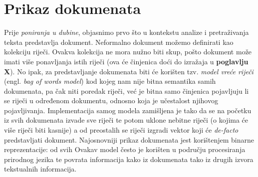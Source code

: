 \documentclass[times, utf8, zavrsni]{fer}
\begin{document}
\section{Prikaz dokumenata}
Prije \textit{poniranja u dubine}, objasnimo prvo što u kontekstu analize i pretraživanja teksta predstavlja dokument. Neformalno dokument možemo definirati kao kolekciju riječi. Ovakva kolekcija ne mora nužno biti skup, pošto dokument može imati više ponavljanja istih riječi (ova će činjenica doći do izražaja u \textbf{poglavlju X}). No ipak, za predstavljanje dokumenata biti će korišten tzv. \textit{model vreće riječi} (engl. \textit{bag of words model}) kod kojeg nam nije bitna semantika samih dokumenata, pa čak niti poredak riječi, već je bitna samo činjenica pojavljuju li se riječi u određenom dokumentu, odnosno koja je učestalost njihovog pojavljivanja.
Implementacija samog modela zamišljena je tako da se na početku iz svih dokumenata izvade sve riječi te potom uklone nebitne riječi (o kojima će više riječi biti kasnije) a od preostalih se riječi izgradi vektor koji će \textit{de-facto} predstavljati dokument. Najosnovniji prikaz dokumenata jest korištenjem binarne reprezentacije: od svih 
Ovakav model često je korišten u području procesiranja prirodnog jezika te povrata informacija kako iz dokumenata tako iz drugih izvora tekstualnih informacija.
\end{document}
